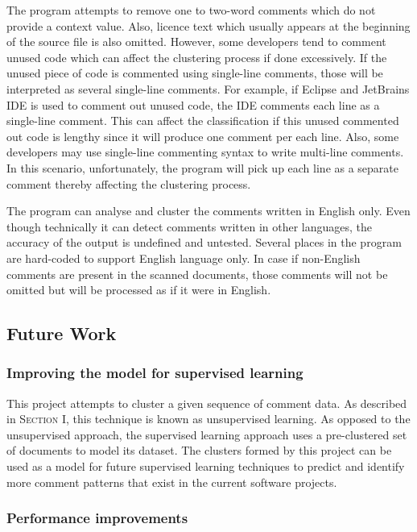 \documentclass[conference]{IEEEtran}
\begin{document}
The program attempts to remove one to two-word comments which do not provide a context value. Also, licence text which usually appears at the beginning of the source file is also omitted. However, some developers tend to comment unused code which can affect the clustering process if done excessively. If the unused piece of code is commented using single-line comments, those will be interpreted as several single-line comments. For example, if Eclipse and JetBrains IDE is used to comment out unused code, the IDE comments each line as a single-line comment. This can affect the classification if this unused commented out code is lengthy since it will produce one comment per each line. Also, some developers may use single-line commenting syntax to write multi-line comments. In this scenario, unfortunately, the program will pick up each line as a separate comment thereby affecting the clustering process. 

The program can analyse and cluster the comments written in English only. Even though technically it can detect comments written in other languages, the accuracy of the output is undefined and untested. Several places in the program are hard-coded to support English language only. In case if non-English comments are present in the scanned documents, those comments will not be omitted but will be processed as if it were in English. 

\subsection{Future Work}

\subsubsection{Improving the model for supervised learning} 

This project attempts to cluster a given sequence of comment data. As described in \textsc{Section I}, this technique is known as unsupervised learning. As opposed to the unsupervised approach, the supervised learning approach uses a pre-clustered set of documents to model its dataset. The clusters formed by this project can be used as a model for future supervised learning techniques to predict and identify more comment patterns that exist in the current software projects. 

\subsubsection{Performance improvements} 
\end{document}
